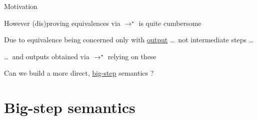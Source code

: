\documentclass{beamer}
\begin{document}
\begin{frame}{ Motivation }

        However (dis)proving equivalences via $\longrightarrow^\star$ is quite cumbersome

        Due to equivalence being concerned only with
        \alert{\underline{output}} \dots\ not intermediate steps \dots

        \dots\ and outputs obtained via $\longrightarrow^\star$
        relying on these

        \pause
        \bigskip
        Can we build a more direct, \alert{\underline{big-step}} semantics ?
\end{frame}

\section{Big-step semantics}
\end{document}
